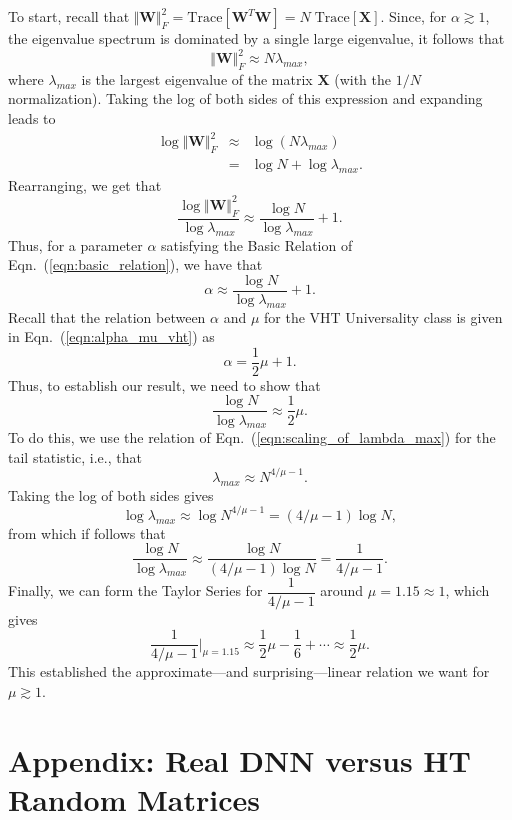 To start, recall that $ \Vert \mathbf{W}\Vert_{F}^{2}=\mbox{Trace}[\mathbf{W}^{T}\mathbf{W}]=N\;\mbox{Trace}[\mathbf{X}]$.
Since, for $\alpha \gtrsim 1$, the eigenvalue spectrum is dominated by a single large eigenvalue, it follows that
$$
\Vert \mathbf{W}\Vert_{F}^{2}\approx N\lambda_{max}  , 
$$
where $\lambda_{max}$ is the largest eigenvalue of the matrix $\mathbf{X}$ (with the $1/N$ normalization).
Taking the log of both sides of this expression and expanding leads to
\begin{eqnarray*}
\log\Vert \mathbf{W}\Vert_{F}^{2} 
   &\approx& \log \left( N\lambda_{max} \right) \\
   &=&       \log N+\log\lambda_{max}  .
\end{eqnarray*}
Rearranging, we get that 
$$
\dfrac{\log\Vert \mathbf{W}\Vert_{F}^{2}}{\log\lambda_{max}}\approx \dfrac{\log N}{\log\lambda_{max}}+1  .
$$
Thus, for a parameter $\alpha$ satisfying the Basic Relation of Eqn.~(\ref{eqn:basic_relation}), we have that 
$$
\alpha\approx \dfrac{\log N}{\log\lambda_{max}}+1  .
$$
Recall that the relation between $\alpha$ and $\mu$ for the VHT Universality class is given in Eqn.~(\ref{eqn:alpha_mu_vht}) as
$$
\alpha=\dfrac{1}{2}\mu+1  .
$$
Thus, to establish our result, we need to show that
$$
\dfrac{\log N}{\log\lambda_{max}}\approx\dfrac{1}{2}\mu  .
$$
To do this, we use the relation of Eqn.~(\ref{eqn:scaling_of_lambda_max}) for the tail statistic, i.e., that 
$$
\lambda_{max}\approx N^{4/\mu-1}  .
$$
Taking the log of both sides gives
$$
\log\lambda_{max}\approx\log N^{4/\mu-1}=(4/\mu-1)\log N  ,
$$
from which if follows that
$$
\dfrac{\log N}{\log\lambda_{max}}\approx\dfrac{\log N}{(4/\mu-1)\log N}=\dfrac{1}{4/\mu-1}   .
$$
Finally, we can form the Taylor Series for $\dfrac{1}{4/\mu-1}$ around $\mu=1.15\approx 1$, which gives 
$$
\dfrac{1}{4/\mu-1}\bigg\rvert_{\mu=1.15}\approx\dfrac{1}{2}\mu-\dfrac{1}{6}+\cdots\approx\dfrac{1}{2}\mu  .
$$
This established the approximate---and surprising---linear relation we want for $\mu \gtrsim 1$. 


\section{Appendix: Real DNN versus HT Random Matrices}
\label{sxn:appendix-dnn_versus_random}


